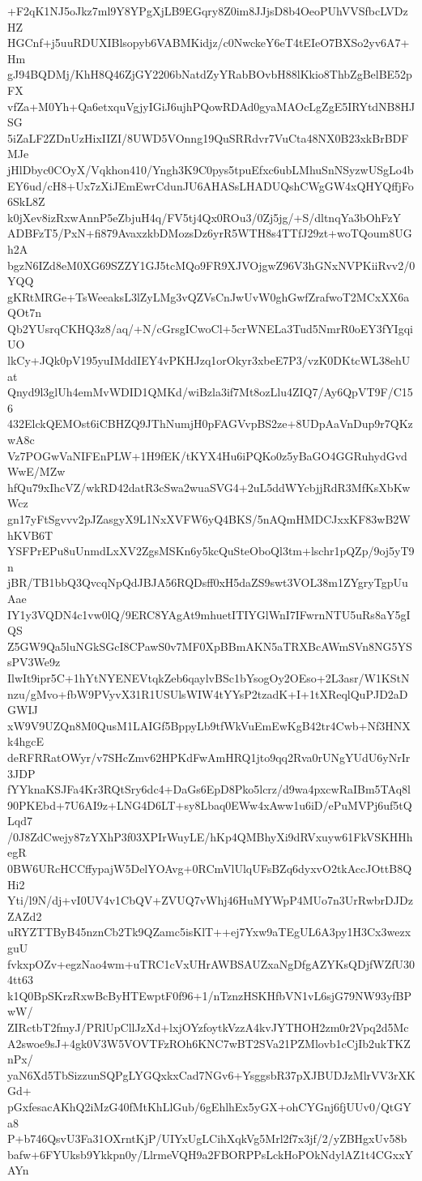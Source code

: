 +F2qK1NJ5oJkz7ml9Y8YPgXjLB9EGqry8Z0im8JJjsD8b4OeoPUhVVSfbcLVDzHZ
HGCnf+j5uuRDUXIBlsopyb6VABMKidjz/c0NwckeY6eT4tEIeO7BXSo2yv6A7+Hm
gJ94BQDMj/KhH8Q46ZjGY2206bNatdZyYRabBOvbH88lKkio8ThbZgBelBE52pFX
vfZa+M0Yh+Qa6etxquVgjyIGiJ6ujhPQowRDAd0gyaMAOcLgZgE5IRYtdNB8HJSG
5iZaLF2ZDnUzHixIIZI/8UWD5VOnng19QuSRRdvr7VuCta48NX0B23xkBrBDFMJe
jHlDbyc0COyX/Vqkhon410/Yngh3K9C0pys5tpuEfxc6ubLMhuSnNSyzwUSgLo4b
EY6ud/cH8+Ux7zXiJEmEwrCdunJU6AHASsLHADUQshCWgGW4xQHYQffjFo6SkL8Z
k0jXev8izRxwAnnP5eZbjuH4q/FV5tj4Qx0ROu3/0Zj5jg/+S/dltnqYa3bOhFzY
ADBFzT5/PxN+fi879AvaxzkbDMozsDz6yrR5WTH8s4TTfJ29zt+woTQoum8UGh2A
bgzN6IZd8eM0XG69SZZY1GJ5tcMQo9FR9XJVOjgwZ96V3hGNxNVPKiiRvv2/0YQQ
gKRtMRGe+TsWeeaksL3lZyLMg3vQZVsCnJwUvW0ghGwfZrafwoT2MCxXX6aQOt7n
Qb2YUsrqCKHQ3z8/aq/+N/cGrsgICwoCl+5crWNELa3Tud5NmrR0oEY3fYIgqiUO
lkCy+JQk0pV195yuIMddIEY4vPKHJzq1orOkyr3xbeE7P3/vzK0DKtcWL38ehUat
Qnyd9l3glUh4emMvWDID1QMKd/wiBzla3if7Mt8ozLlu4ZIQ7/Ay6QpVT9F/C156
432ElckQEMOst6iCBHZQ9JThNumjH0pFAGVvpBS2ze+8UDpAaVnDup9r7QKzwA8c
Vz7POGwVaNIFEnPLW+1H9fEK/tKYX4Hu6iPQKo0z5yBaGO4GGRuhydGvdWwE/MZw
hfQu79xIhcVZ/wkRD42datR3cSwa2wuaSVG4+2uL5ddWYcbjjRdR3MfKsXbKwWcz
gn17yFtSgvvv2pJZasgyX9L1NxXVFW6yQ4BKS/5nAQmHMDCJxxKF83wB2WhKVB6T
YSFPrEPu8uUnmdLxXV2ZgsMSKn6y5kcQuSteOboQl3tm+lschr1pQZp/9oj5yT9n
jBR/TB1bbQ3QvcqNpQdJBJA56RQDsff0xH5daZS9swt3VOL38m1ZYgryTgpUuAae
IY1y3VQDN4c1vw0lQ/9ERC8YAgAt9mhuetITIYGlWnI7IFwrnNTU5uRs8aY5gIQS
Z5GW9Qa5luNGkSGcI8CPawS0v7MF0XpBBmAKN5aTRXBcAWmSVn8NG5YSsPV3We9z
IlwIt9ipr5C+1hYtNYENEVtqkZeb6qaylvBSc1bYsogOy2OEso+2L3asr/W1KStN
nzu/gMvo+fbW9PVyvX31R1USUlsWIW4tYYsP2tzadK+I+1tXReqlQuPJD2aDGWIJ
xW9V9UZQn8M0QusM1LAIGf5BppyLb9tfWkVuEmEwKgB42tr4Cwb+Nf3HNXk4hgcE
deRFRRatOWyr/v7SHcZmv62HPKdFwAmHRQ1jto9qq2Rva0rUNgYUdU6yNrIr3JDP
fYYknaKSJFa4Kr3RQtSry6dc4+DaGs6EpD8Pko5lcrz/d9wa4pxcwRaIBm5TAq8l
90PKEbd+7U6AI9z+LNG4D6LT+sy8Lbaq0EWw4xAww1u6iD/ePuMVPj6uf5tQLqd7
/0J8ZdCwejy87zYXhP3f03XPIrWuyLE/hKp4QMBhyXi9dRVxuyw61FkVSKHHhegR
0BW6URcHCCffypajW5DelYOAvg+0RCmVlUlqUFsBZq6dyxvO2tkAccJOttB8QHi2
Yti/l9N/dj+vI0UV4v1CbQV+ZVUQ7vWhj46HuMYWpP4MUo7n3UrRwbrDJDzZAZd2
uRYZTTByB45nznCb2Tk9QZamc5isKlT++ej7Yxw9aTEgUL6A3py1H3Cx3wezxguU
fvkxpOZv+egzNao4wm+uTRC1cVxUHrAWBSAUZxaNgDfgAZYKsQDjfWZfU304tt63
k1Q0BpSKrzRxwBcByHTEwptF0f96+1/nTznzHSKHfbVN1vL6sjG79NW93yfBPwW/
ZIRctbT2fmyJ/PRlUpCllJzXd+lxjOYzfoytkVzzA4kvJYTHOH2zm0r2Vpq2d5Mc
A2swoe9sJ+4gk0V3W5VOVTFzROh6KNC7wBT2SVa21PZMlovb1cCjIb2ukTKZnPx/
yaN6Xd5TbSizzunSQPgLYGQxkxCad7NGv6+YsggsbR37pXJBUDJzMlrVV3rXKGd+
pGxfesacAKhQ2iMzG40fMtKhLlGub/6gEhlhEx5yGX+ohCYGnj6fjUUv0/QtGYa8
P+b746QsvU3Fa31OXrntKjP/UIYxUgLCihXqkVg5Mrl2f7x3jf/2/yZBHgxUv58b
bafw+6FYUksb9Ykkpn0y/LlrmeVQH9a2FBORPPsLckHoPOkNdylAZ1t4CGxxYAYn
